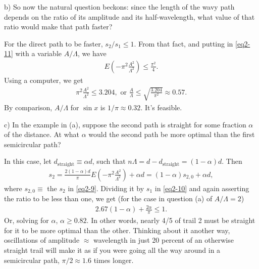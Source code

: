 \documentclass[11pt]{article}
\begin{document}
\vspace{10pt} b) So now the natural question beckons: since the length of the wavy path depends on the ratio of its amplitude and its half-wavelength, what value of that ratio would make that path faster?

\vspace{10pt} For the direct path to be faster, $s_2 / s_1 \leq 1$. From that fact, and putting in \eqref{eq2-11} with a variable $A/\Lambda$, we have
\begin{align} \label{eq2-12}
E \left(-\pi^2 \frac{A^2}{\Lambda^2}\right) \leq \frac{\pi^2}{4}.
\end{align}
Using a computer, we get
\begin{align} \label{eq2-13}
\pi^2 \frac{A^2}{\Lambda^2} \leq 3.204, \text{ or } \frac{A}{\Lambda} \leq \sqrt{\frac{3.204}{\pi^2}} \approx 0.57.
\end{align}
By comparison, $A/\Lambda$ for $\sin x$ is $1/\pi \approx 0.32$. It's feasible.

\vspace{10pt} c) In the example in (a), suppose the second path is straight for some fraction $\alpha$ of the distance. At what $\alpha$ would the second path be more optimal than the first semicircular path?

\vspace{10pt} In this case, let $d_{\text{straight}} \equiv \alpha d$, such that $n \Lambda = d - d_{\text{straight}} = (1-\alpha) d$. Then
\begin{align} 
s_2 = \frac{2(1-\alpha) d}{\pi} E \left(-\pi^2 \frac{A^2}{\Lambda^2} \right) + \alpha d = (1-\alpha) s_{2,0} + \alpha d \label{eq2-14},
\end{align}
where $s_{2,0} \equiv$ the $s_2$ in \eqref{eq2-9}. Dividing it by $s_1$ in \eqref{eq2-10} and again asserting the ratio to be less than one, we get (for the case in question (a) of $A/\Lambda = 2$)
\begin{align} \label{eq2-15}
2.67(1-\alpha) + \frac{2 \alpha}{\pi}\leq 1. 
\end{align}
Or, solving for $\alpha$, $\alpha \geq 0.82$. In other words, nearly 4/5 of trail 2 must be straight for it to be more optimal than the other. Thinking about it another way, oscillations of amplitude $\approx$ wavelength in just 20 percent of an otherwise straight trail will make it as if you were going all the way around in a semicircular path, $\pi/2 \approx 1.6$ times longer.

\end{document}
